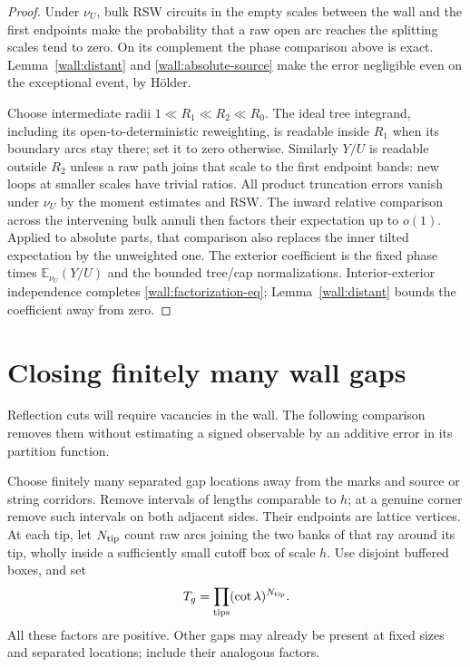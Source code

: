 \begin{proof}
Under $\nu_U$, bulk RSW circuits in the empty scales between the wall
and the first endpoints make the probability that a raw open arc reaches
the splitting scales tend to zero.  On its complement the phase comparison
above is exact.  Lemma~\ref{wall:distant} and
\eqref{wall:absolute-source} make the error negligible even on the
exceptional event, by H\"older.

Choose intermediate radii
$1\ll R_1\ll R_2\ll R_0$.  The ideal tree integrand, including its
open-to-deterministic reweighting, is readable inside $R_1$ when its
boundary arcs stay there; set it to zero otherwise.  Similarly $Y/U$
is readable outside $R_2$ unless a raw path joins that scale to the first
endpoint bands: new loops at smaller scales have trivial ratios.
All product truncation errors vanish under $\nu_U$ by the moment
estimates and RSW.  The inward relative comparison across the intervening
bulk annuli then factors their expectation up to $o(1)$.  Applied to
absolute parts, that comparison also replaces the inner tilted
expectation by the unweighted one.  The exterior coefficient is the
fixed phase times $\mathbb E_{\nu_U}(Y/U)$ and the bounded tree/cap
normalizations.  Interior-exterior independence completes
\eqref{wall:factorization-eq}; Lemma~\ref{wall:distant} bounds the
coefficient away from zero.
\end{proof}

\section{Closing finitely many wall gaps}
\label{sec:closinggaps}

Reflection cuts will require vacancies in the wall.  The following
comparison removes them without estimating a signed observable by an
additive error in its partition function.

Choose finitely many separated gap locations away from the marks and
source or string corridors.  Remove intervals of lengths comparable
to $h$; at a genuine corner remove such intervals on both adjacent
sides.  Their endpoints are lattice vertices.  At each tip, let
$N_{\rm tip}$ count raw arcs joining the two banks of that ray around
its tip, wholly inside a sufficiently small cutoff box of scale $h$.
Use disjoint buffered boxes, and set
\begin{equation}
 T_g=\prod_{\text{tips}}(\cot\lambda)^{N_{\rm tip}}.
 \label{gap:tip-tilt}
\end{equation}
All these factors are positive.  Other gaps may already be present at
fixed sizes and separated locations; include their analogous factors.

